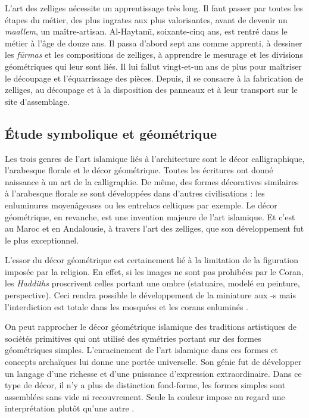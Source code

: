 L'art des zelliges nécessite un apprentissage très long. Il faut 
passer par toutes les étapes du métier, des plus ingrates aux plus 
valorisantes, avant de devenir un \emph{maallem}, un maître-artisan. 
Al-Haytam\={\i}, soixante-cinq ans, est rentré dans le métier à l'âge 
de douze ans. Il passa d'abord sept ans comme apprenti, à dessiner 
les \emph{f\={u}rmas} et les compositions de zelliges, à apprendre 
le mesurage et les divisions géométriques qui leur sont liés. Il 
lui fallut vingt-et-un ans de plus pour maîtriser le découpage et 
l'équarrissage des pièces. Depuis, il se consacre à la fabrication 
de zelliges, au découpage et à la disposition des panneaux et à leur 
transport sur le site d'assemblage.

\subsection{Étude symbolique et géométrique}
Les trois genres de l'art islamique liés à l'architecture sont le 
décor calligraphique, l'arabesque florale et le décor géométrique. 
Toutes les écritures ont donné naissance à un art de la calligraphie. 
De même, des formes décoratives similaires à l'arabesque florale se 
sont développées dans d'autres civilisations : les enluminures 
moyenâgeuses ou les entrelacs celtiques par exemple. Le décor 
géométrique, en revanche, est une invention majeure de l'art 
islamique. Et c'est au Maroc et en Andalousie, à travers l'art des 
zelliges, que son développement fut le plus exceptionnel.

L'essor du décor géométrique est certainement lié à la limitation 
de la figuration imposée par la religion. En effet, si les images 
ne sont pas prohibées par le Coran, les \emph{Haddiths} 
proscrivent celles portant une ombre (statuaire, modelé en peinture, 
perspective). Ceci rendra possible le développement de la miniature 
aux -s mais l'interdiction est totale dans 
les mosquées et les corans enluminés \autocite{Castera_1996}.

On peut rapprocher le décor géométrique islamique des traditions 
artistiques de sociétés primitives qui ont utilisé des symétries 
portant sur des formes géométriques simples. L'enracinement de l'art 
islamique dans ces formes et concepts archaïques lui donne une portée 
universelle. Son génie fut de développer un langage d'une richesse et 
d'une puissance d'expression extraordinaire. Dans ce type de décor, 
il n'y a plus de distinction fond-forme, les formes simples sont 
assemblées sans vide ni recouvrement. Seule la couleur impose au 
regard une interprétation plutôt qu'une autre \autocite{Castera_1996}.

